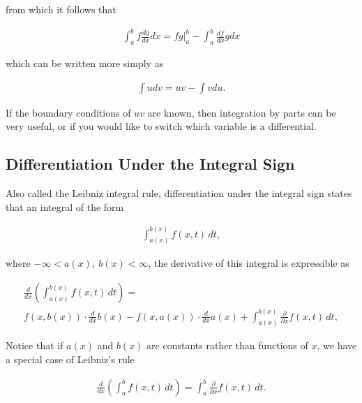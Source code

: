 \documentclass{article}
\numberwithin{theorem}{subsection}
\numberwithin{theorem}{subsubsection}
\numberwithin{lemma}{subsection}
\numberwithin{lemma}{subsubsection}
\theoremstyle{definition}
\numberwithin{definition}{subsection}
\numberwithin{definition}{subsubsection}
\begin{document}
\noindent from which it follows that 

\begin{gather*}
    \int_{a}^{b} f \frac{dg}{dx}dx = fg|_{a}^{b} - \int_{a}^{b} \frac{df}{dx}gdx
\end{gather*}

\noindent which can be written more simply as

\begin{gather*}
    \int udv = uv - \int vdu.
\end{gather*}

If the boundary conditions of $uv$ are known, then integration by parts can be very useful, or if you would like to switch which variable is a differential.

\subsection{Differentiation Under the Integral Sign}
Also called the Leibniz integral rule, differentiation under the integral sign states that an integral of the form

\begin{gather*}
    \int_{a(x)}^{b(x)} f(x,t)\,dt,
\end{gather*}

\noindent where $-\infty < a(x),\ b(x) < \infty$, the derivative of this integral is expressible as

\begin{gather*}
    \frac{d}{dx} \left (\int_{a(x)}^{b(x)} f(x,t)\,dt \right ) = \\ f(x,b(x))\cdot \frac{d}{dx} b(x) - f(x,a(x))\cdot \frac{d}{dx} a(x) + \int_{a(x)}^{b(x)}\frac{\partial}{\partial x} f(x,t) \,dt,
\end{gather*}

Notice that if $a(x)$ and $b(x)$ are constants rather than functions of $x$, we have a special case of Leibniz's rule

\begin{gather*}
    \frac{d}{dx} \left(\int_{a}^{b} f(x,t)\,dt \right)= \int_{a}^{b}\frac{\partial}{\partial x} f(x,t) \,dt.
\end{gather*}
\end{document}
